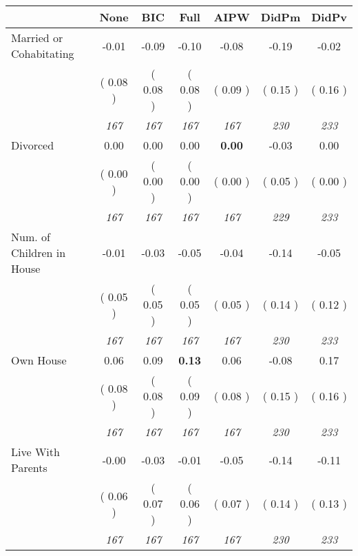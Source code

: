 \begin{tabular}{l c c c c c c}
\toprule
 & None & BIC & Full & AIPW & DidPm & DidPv \\
\midrule
Married or Cohabitating &     -0.01 &     -0.09 &     -0.10 &     -0.08 &     -0.19 &     -0.02 \\
& (     0.08 ) & (     0.08 ) & (     0.08 ) & (     0.09 ) & (     0.15 ) & (     0.16 ) \\
& \textit{ 167 } & \textit{ 167 } & \textit{ 167 } & \textit{ 167 } & \textit{ 230 } & \textit{ 233 } \\
Divorced &      0.00 &      0.00 &      0.00 & \textbf{     0.00} &     -0.03 &      0.00 \\
& (     0.00 ) & (     0.00 ) & (     0.00 ) & (     0.00 ) & (     0.05 ) & (     0.00 ) \\
& \textit{ 167 } & \textit{ 167 } & \textit{ 167 } & \textit{ 167 } & \textit{ 229 } & \textit{ 233 } \\
Num. of Children in House &     -0.01 &     -0.03 &     -0.05 &     -0.04 &     -0.14 &     -0.05 \\
& (     0.05 ) & (     0.05 ) & (     0.05 ) & (     0.05 ) & (     0.14 ) & (     0.12 ) \\
& \textit{ 167 } & \textit{ 167 } & \textit{ 167 } & \textit{ 167 } & \textit{ 230 } & \textit{ 233 } \\
Own House &      0.06 &      0.09 & \textbf{      0.13 } &      0.06 &     -0.08 &      0.17 \\
& (     0.08 ) & (     0.08 ) & (     0.09 ) & (     0.08 ) & (     0.15 ) & (     0.16 ) \\
& \textit{ 167 } & \textit{ 167 } & \textit{ 167 } & \textit{ 167 } & \textit{ 230 } & \textit{ 233 } \\
Live With Parents &     -0.00 &     -0.03 &     -0.01 &     -0.05 &     -0.14 &     -0.11 \\
& (     0.06 ) & (     0.07 ) & (     0.06 ) & (     0.07 ) & (     0.14 ) & (     0.13 ) \\
& \textit{ 167 } & \textit{ 167 } & \textit{ 167 } & \textit{ 167 } & \textit{ 230 } & \textit{ 233 } \\
\bottomrule
\end{tabular}
